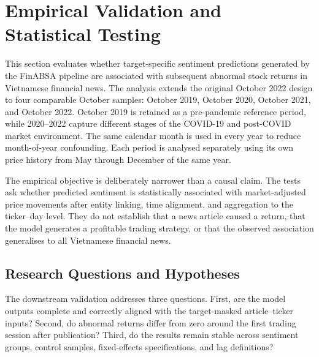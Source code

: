 %
%

\section{Empirical Validation and Statistical Testing}
\label{sec:empirical-validation}

This section evaluates whether target-specific sentiment predictions generated by the FinABSA pipeline are associated with subsequent abnormal stock returns in Vietnamese financial news. The analysis extends the original October 2022 design to four comparable October samples: October 2019, October 2020, October 2021, and October 2022. October 2019 is retained as a pre-pandemic reference period, while 2020--2022 capture different stages of the COVID-19 and post-COVID market environment. The same calendar month is used in every year to reduce month-of-year confounding. Each period is analysed separately using its own price history from May through December of the same year.

The empirical objective is deliberately narrower than a causal claim. The tests ask whether predicted sentiment is statistically associated with market-adjusted price movements after entity linking, time alignment, and aggregation to the ticker--day level. They do not establish that a news article caused a return, that the model generates a profitable trading strategy, or that the observed association generalises to all Vietnamese financial news.

\subsection{Research Questions and Hypotheses}
\label{subsec:research-questions-statistics}

The downstream validation addresses three questions. First, are the model outputs complete and correctly aligned with the target-masked article--ticker inputs? Second, do abnormal returns differ from zero around the first trading session after publication? Third, do the results remain stable across sentiment groups, control samples, fixed-effects specifications, and lag definitions?

